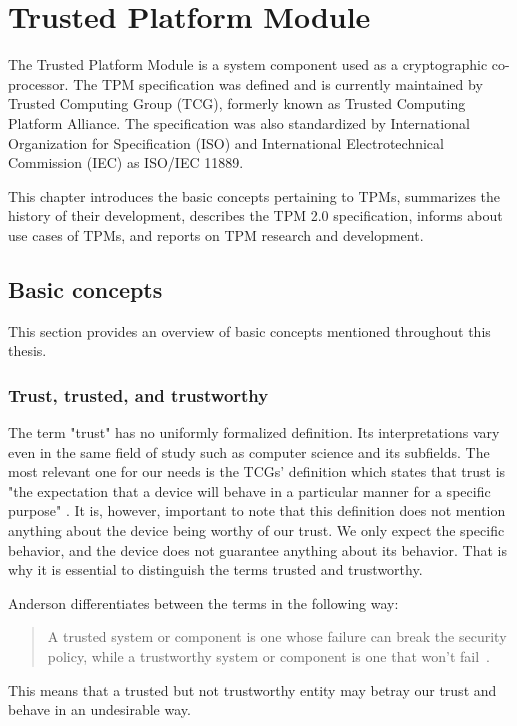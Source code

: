 \chapter{Trusted Platform Module}
The Trusted Platform Module is a system component used as a cryptographic co-processor. The TPM specification was defined and is currently maintained by Trusted Computing Group (TCG), formerly known as Trusted Computing Platform Alliance. The specification was also standardized by International Organization for Specification (ISO) and International Electrotechnical Commission (IEC) as ISO/IEC 11889.

This chapter introduces the basic concepts pertaining to TPMs, summarizes the history of their development, describes the TPM 2.0 specification, informs about use cases of TPMs, and reports on TPM research and development.

\section{Basic concepts}
This section provides an overview of basic concepts mentioned throughout this thesis. 

\subsection{Trust, trusted, and trustworthy}\label{sec:trust-def}
The term "trust" has no uniformly formalized definition. Its interpretations vary even in the same field of study such as computer science and its subfields. The most relevant one for our needs is the TCGs' definition which states that trust is "the expectation that a device will behave in a particular manner for a specific purpose" \cite{tcg_arch_overview}. It is, however, important to note that this definition does not mention anything about the device being worthy of our trust. We only expect the specific behavior, and the device does not guarantee anything about its behavior. That is why it is essential to distinguish the terms trusted and trustworthy. 

Anderson differentiates between the terms in the following way:
\begin{quote}
A trusted system or component is one whose failure can break the security policy, while a trustworthy system or component is one that won’t fail~\cite{andersonSecEng}.
\end{quote}

This means that a trusted but not trustworthy entity may betray our trust and behave in an undesirable way.

